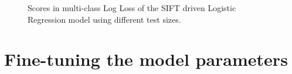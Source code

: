 \begin{figure}[H]
    \centering
    \captionsetup{width=0.65\linewidth}
    \captionsetup{justification=centering}
    \caption{Scores in multi-class Log Loss of the SIFT driven Logistic Regression model using different test sizes.}
    \label{fig:2-LBM-test_size_sift}
\end{figure}




\section{Fine-tuning the model parameters}
\label{section:LBM_finetuning_model}

